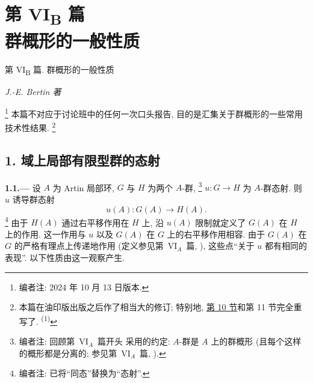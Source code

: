 
\setcounter{footnote}{-1}
\chapter*{第 \texorpdfstring{VI\textsubscript{B}}{VI_B} 篇\\群概形的一般性质}
\label{sga3:VIB:title}
%
  {第 VI\textsubscript{B} 篇. 群概形的一般性质}

\begin{center}
  \textit{J.-E. Bertin 著}
\end{center}

\footnote{\label{note:sga3-VIB-0}编者注: 2024 年 10 月 13 日版本.}
本篇不对应于讨论班中的任何一次口头报告,
目的是汇集关于群概形的一些常用技术性结果.%
\begingroup
\renewcommand{\thefootnote}{\fnsymbol{footnote}}%
\footnote[1]{本篇在油印版出版之后作了相当大的修订;
特别地, \hyperref[sec:sga3-VIB-10]{第 10 节}和第 11 节完全重写了.
\textsuperscript{(1)}}%
\endgroup
{}
\setcounter{footnote}{1}

\section*{1. 域上局部有限型群的态射}
\label{sec:sga3-VIB-1}

\medskip
{}\label{par:sga3-VIB-1.1}%
\noindent\textbf{1.1.---}
设 \(A\) 为 Artin 局部环, \(G\) 与 \(H\) 为两个 \(A\)-群,%
\footnote{\label{note:sga3-VIB-2}编者注: 回顾第~VI\(_A\)~篇开头
采用的约定: \(A\)-群是 \(A\) 上的群概形
(且每个这样的概形都是分离的; 参见第~VI\(_A\)~篇,
).}
\(u:G\to H\) 为 \(A\)-群态射. 则 \(u\) 诱导群态射
\[
  u(A):G(A)\longrightarrow H(A).
\]%
\footnote{\label{note:sga3-VIB-3}编者注: 已将``同态''替换为``态射''.}
由于 \(H(A)\) 通过右平移作用在 \(H\) 上,
沿 \(u(A)\) 限制就定义了 \(G(A)\) 在 \(H\) 上的作用.
这一作用与 \(u\) 以及 \(G(A)\) 在 \(G\) 上的右平移作用相容.
由于 \(G(A)\) 在 \(G\) 的严格有理点上传递地作用
(定义参见第~VI\(_A\)~篇, ),
这些点``关于 \(u\) 都有相同的表现''.
以下性质由这一观察产生.

